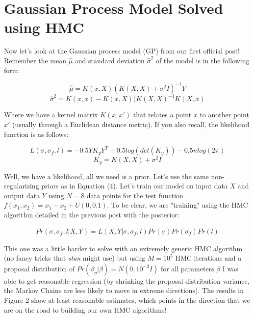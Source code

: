 \documentclass[12pt]{article}
\begin{document}
\section{Gaussian Process Model Solved using HMC}

Now let's look at the Gaussian process model (GP) from our first official post! Remember the mean $\hat{\mu}$ and standard deviation $\hat{\sigma}^{2}$ of the model is in the following form:

\begin{equation}
\hat{\mu} = K(x,X)(K(X,X) + \sigma^{2}I)^{-1}Y
\end{equation}
\begin{equation}
\hat{\sigma}^{2} = K(x,x) - K(x,X)(K(X,X)^{-1}K(X,x)
\end{equation}

\vspace{5mm}

Where we have a kernel matrix $K(x,x')$ that relates a point $x$ to another point $x'$ (usually through a Euclidean distance metric). If you also recall, the likelihood function is as follows:

\begin{equation}
L(\sigma,\sigma_{f},l) = -0.5YK_{y}Y^{T} - 0.5log(det(K_{y}))-0.5nlog(2\pi)
\end{equation}
\begin{equation}
K_{y} = K(X,X)+\sigma^2 I
\end{equation}

\vspace{5mm}

Well, we have a likelihood, all we need is a prior. Let's use the same non-regularizing priors as in Equation (4). Let's train our model on input data $X$ and output data $Y$ using $N=8$ data points for the test function $f(x_1,x_2)=x_1-x_2+U(0,0.1)$. To be clear, we are "training" using the HMC algorithm detailed in the previous post with the posterior:

\begin{align*}
Pr(\sigma,\sigma_{f},l|X,Y)=L(X,Y|\sigma,\sigma_{f},l)Pr(\sigma)Pr(\sigma_f)Pr(l)
\end{align*}

\vspace{5mm}

This one was a little harder to solve with an extremely generic HMC algorithm (no fancy tricks that \emph{stan} might use) but using $M=10^5$ HMC iterations and a proposal distribution of $Pr(\beta_p|\beta)=N(0,10^{-3}I)$ for all parameters $\beta$ I was able to get reasonable regression (by shrinking the proposal distribution variance, the Markov Chains are less likely to move in extreme directions). The results in Figure 2 show at least reasonable estimates, which points in the direction that we are on the road to building our own HMC algorithms!
\end{document}

